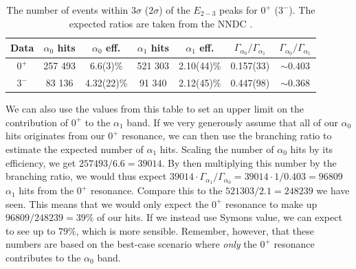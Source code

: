 \begin{table}[h]
	\begin{tabular}{c|cccccc}
		Data & $\alpha_0$ hits & $\alpha_0$ eff. & $\alpha_1$ hits & $\alpha_1$ eff. & $\Gamma_{\alpha_0}/\Gamma_{\alpha_1}$ & $\Gamma_{\alpha_0}/\Gamma_{\alpha_1}$ \cite{nudat} \\ \hline
		$0^+$ & 257 493 & 6.6(3)\% & 521 303 & 2.10(44)\% & 0.157(33) & $\sim 0.403$\\
		$3^-$ & 83 136 & 4.32(22)\% & 91 340 & 2.12(45)\% & 0.447(98) & $\sim 0.368$
	\end{tabular}
	\caption{The number of events within $3\sigma$ ($2\sigma$) of the $E_{2-3}$ peaks for $0^+$ ($3^-$). The expected ratios are taken from the NNDC \cite{nudat}.}
	\label{table: analysis: branching ratio}
\end{table}

We can also use the values from this table to set an upper limit on the contribution of $0^+$ to the $\alpha_1$ band. If we very generously assume that all of our $\alpha_0$ hits originates from our $0^+$ resonance, we can then use the branching ratio to estimate the expected number of $\alpha_1$ hits. Scaling the number of $\alpha_0$ hits by its efficiency, we get $257493/6.6 = 39014$. By then multiplying this number by the branching ratio, we would thus expect $39014 \cdot \Gamma_{\alpha_1}/\Gamma_{\alpha_0} = 39014 \cdot 1/0.403 = 96809$ $\alpha_1$ hits from the $0^+$ resonance. Compare this to the $521303/2.1 = 248239$ we have seen. This means that we would only expect the $0^+$ resonance to make up $96809/248239 = 39\%$ of our hits. If we instead use Symons value, we can expect to see up to $79\%$, which is more sensible. Remember, however, that these numbers are based on the best-case scenario where \textit{only} the $0^+$ resonance contributes to the $\alpha_0$ band. \\

